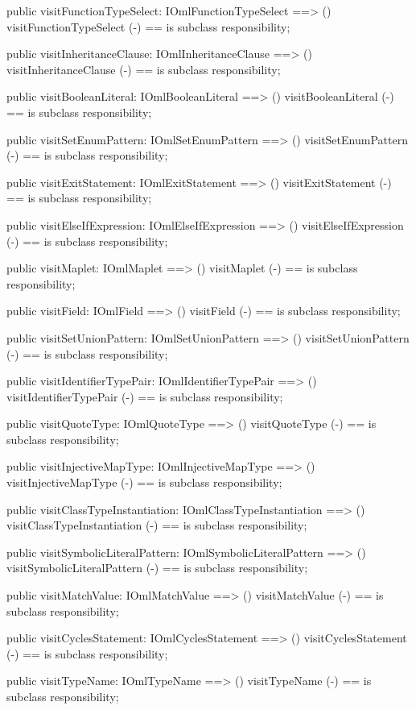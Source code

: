 \begin{vdm_al}
  public visitFunctionTypeSelect: IOmlFunctionTypeSelect ==> ()
  visitFunctionTypeSelect (-) == is subclass responsibility;

  public visitInheritanceClause: IOmlInheritanceClause ==> ()
  visitInheritanceClause (-) == is subclass responsibility;

  public visitBooleanLiteral: IOmlBooleanLiteral ==> ()
  visitBooleanLiteral (-) == is subclass responsibility;

  public visitSetEnumPattern: IOmlSetEnumPattern ==> ()
  visitSetEnumPattern (-) == is subclass responsibility;

  public visitExitStatement: IOmlExitStatement ==> ()
  visitExitStatement (-) == is subclass responsibility;

  public visitElseIfExpression: IOmlElseIfExpression ==> ()
  visitElseIfExpression (-) == is subclass responsibility;

  public visitMaplet: IOmlMaplet ==> ()
  visitMaplet (-) == is subclass responsibility;

  public visitField: IOmlField ==> ()
  visitField (-) == is subclass responsibility;

  public visitSetUnionPattern: IOmlSetUnionPattern ==> ()
  visitSetUnionPattern (-) == is subclass responsibility;

  public visitIdentifierTypePair: IOmlIdentifierTypePair ==> ()
  visitIdentifierTypePair (-) == is subclass responsibility;

  public visitQuoteType: IOmlQuoteType ==> ()
  visitQuoteType (-) == is subclass responsibility;

  public visitInjectiveMapType: IOmlInjectiveMapType ==> ()
  visitInjectiveMapType (-) == is subclass responsibility;

  public visitClassTypeInstantiation: IOmlClassTypeInstantiation ==> ()
  visitClassTypeInstantiation (-) == is subclass responsibility;

  public visitSymbolicLiteralPattern: IOmlSymbolicLiteralPattern ==> ()
  visitSymbolicLiteralPattern (-) == is subclass responsibility;

  public visitMatchValue: IOmlMatchValue ==> ()
  visitMatchValue (-) == is subclass responsibility;

  public visitCyclesStatement: IOmlCyclesStatement ==> ()
  visitCyclesStatement (-) == is subclass responsibility;

  public visitTypeName: IOmlTypeName ==> ()
  visitTypeName (-) == is subclass responsibility;


\end{vdm_al}
